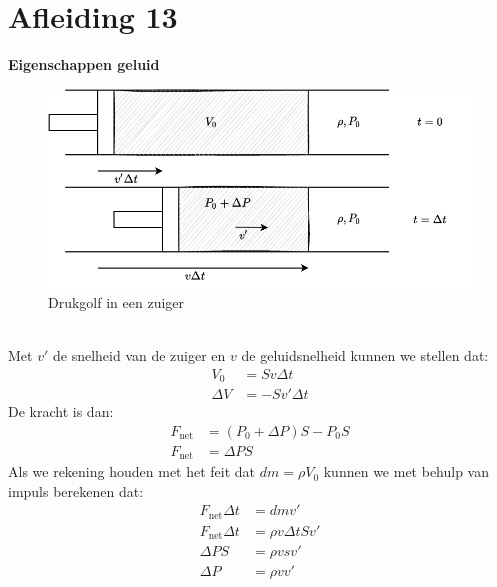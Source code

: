 \documentclass[a4paper,kul]{kulakarticle} %
\begin{document}
\section{Afleiding 13}
\textbf{Eigenschappen geluid}\\
\begin{figure}[h]
	\centering
	\includegraphics[width=0.7\linewidth]{EigenschappenGeluid}
	\caption[Zuiger]{Drukgolf in een zuiger}
	\label{fig:drukgolfzuiger}
\end{figure}\\
Met $v'$ de snelheid van de zuiger en $v$ de geluidsnelheid kunnen we stellen dat:
\begin{align*}
	V_0 &=Sv\Delta t\\
	\Delta V &= -Sv'\Delta t
\end{align*}
De kracht is dan:
\begin{align*}
	F_{\text{net}} &= (P_0+\Delta P)S-P_0S\\
	F_{\text{net}}&= \Delta PS
\end{align*}
Als we rekening houden met het feit dat $dm=\rho V_0$ kunnen we met behulp van impuls berekenen dat:
\begin{align*}
	F_{\text{net}} \Delta t &=dmv'\\
	F_{\text{net}}\Delta t &= \rho v\Delta tSv'\\
	\Delta PS &= \rho vsv'\\
	\Delta P &= \rho vv'
\end{align*}
\newpage
\end{document}
